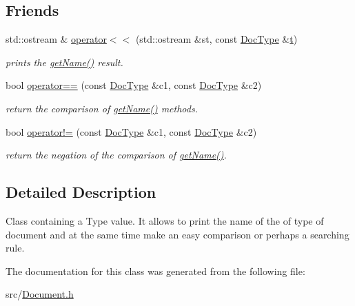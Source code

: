 \subsection*{Friends}
\begin{DoxyCompactItemize}
\item 
\hypertarget{classdocs_1_1DocType_ab7f2e778c65c36835a714e77aa2c3a09}{std\-::ostream \& \hyperlink{classdocs_1_1DocType_ab7f2e778c65c36835a714e77aa2c3a09}{operator$<$$<$} (std\-::ostream \&st, const \hyperlink{classdocs_1_1DocType}{Doc\-Type} \&\hyperlink{classdocs_1_1DocType_a58ced824f3508e8f8d73b1ff1bfefc0a}{t})}\label{classdocs_1_1DocType_ab7f2e778c65c36835a714e77aa2c3a09}

\begin{DoxyCompactList}\small\item\em prints the \hyperlink{classdocs_1_1DocType_a4632fc57ed71ebb984aa8dd78017db03}{get\-Name()} result. \end{DoxyCompactList}\item 
\hypertarget{classdocs_1_1DocType_aa68c01dc0d9b0494723b223bf52a6acf}{bool \hyperlink{classdocs_1_1DocType_aa68c01dc0d9b0494723b223bf52a6acf}{operator==} (const \hyperlink{classdocs_1_1DocType}{Doc\-Type} \&c1, const \hyperlink{classdocs_1_1DocType}{Doc\-Type} \&c2)}\label{classdocs_1_1DocType_aa68c01dc0d9b0494723b223bf52a6acf}

\begin{DoxyCompactList}\small\item\em return the comparison of \hyperlink{classdocs_1_1DocType_a4632fc57ed71ebb984aa8dd78017db03}{get\-Name()} methods. \end{DoxyCompactList}\item 
\hypertarget{classdocs_1_1DocType_a6f7b8c51d3dc0ec95808119766eb8010}{bool \hyperlink{classdocs_1_1DocType_a6f7b8c51d3dc0ec95808119766eb8010}{operator!=} (const \hyperlink{classdocs_1_1DocType}{Doc\-Type} \&c1, const \hyperlink{classdocs_1_1DocType}{Doc\-Type} \&c2)}\label{classdocs_1_1DocType_a6f7b8c51d3dc0ec95808119766eb8010}

\begin{DoxyCompactList}\small\item\em return the negation of the comparison of \hyperlink{classdocs_1_1DocType_a4632fc57ed71ebb984aa8dd78017db03}{get\-Name()}. \end{DoxyCompactList}\end{DoxyCompactItemize}


\subsection{Detailed Description}
Class containing a Type value. It allows to print the name of the of type of document and at the same time make an easy comparison or perhaps a searching rule. 

The documentation for this class was generated from the following file\-:\begin{DoxyCompactItemize}
\item 
src/\hyperlink{Document_8h}{Document.\-h}\end{DoxyCompactItemize}
